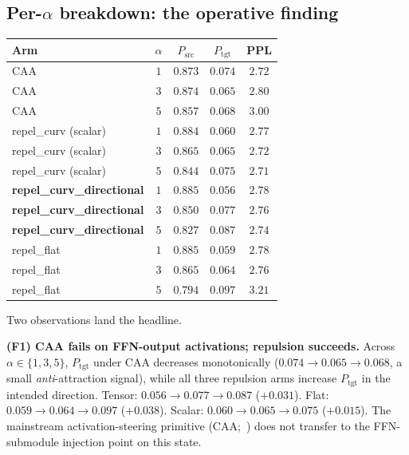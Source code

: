 \documentclass[10pt,twocolumn]{article}
\begin{document}
\subsection{Per-$\alpha$ breakdown: the operative finding}

\begin{center}\small
\begin{tabular}{lcccc}
\toprule
Arm & $\alpha$ & $P_{\text{src}}$ & $P_{\text{tgt}}$ & PPL \\
\midrule
CAA                       & $1$ & $0.873$ & $0.074$ & $2.72$ \\
CAA                       & $3$ & $0.874$ & $0.065$ & $2.80$ \\
CAA                       & $5$ & $0.857$ & $0.068$ & $3.00$ \\
\midrule
repel\_curv (scalar)      & $1$ & $0.884$ & $0.060$ & $2.77$ \\
repel\_curv (scalar)      & $3$ & $0.865$ & $0.065$ & $2.72$ \\
repel\_curv (scalar)      & $5$ & $0.844$ & $0.075$ & $2.71$ \\
\midrule
\textbf{repel\_curv\_directional} & $1$ & $0.885$ & $0.056$ & $2.78$ \\
\textbf{repel\_curv\_directional} & $3$ & $0.850$ & $0.077$ & $2.76$ \\
\textbf{repel\_curv\_directional} & $5$ & $\mathbf{0.827}$ & $\mathbf{0.087}$ & $\mathbf{2.74}$ \\
\midrule
repel\_flat               & $1$ & $0.885$ & $0.059$ & $2.78$ \\
repel\_flat               & $3$ & $0.865$ & $0.064$ & $2.76$ \\
repel\_flat               & $5$ & $0.794$ & $0.097$ & $\mathit{3.21}$ \\
\bottomrule
\end{tabular}
\end{center}

Two observations land the headline.

\textbf{(F1) CAA fails on FFN-output activations; repulsion succeeds.} Across $\alpha\in\{1,3,5\}$, $P_{\text{tgt}}$ under CAA decreases monotonically ($0.074\to 0.065\to 0.068$, a small \emph{anti}-attraction signal), while all three repulsion arms increase $P_{\text{tgt}}$ in the intended direction. Tensor: $0.056\to 0.077\to 0.087$ ($+0.031$). Flat: $0.059\to 0.064\to 0.097$ ($+0.038$). Scalar: $0.060\to 0.065\to 0.075$ ($+0.015$). The mainstream activation-steering primitive (CAA;~\citealp{panickssery2023steering}) does not transfer to the FFN-submodule injection point on this state.
\end{document}
